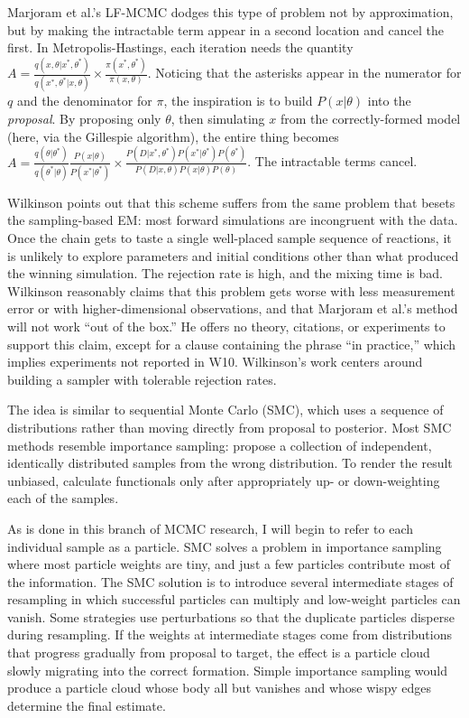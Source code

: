 \documentclass{article}
\begin{document}
Marjoram et al.'s LF-MCMC dodges this type of problem not by approximation, but by making the intractable term appear in a second location and cancel the first. In Metropolis-Hastings, each iteration needs the quantity $A=\frac{q(x, \theta|x^*, \theta^*)}{q(x^*, \theta^*|x, \theta)} \times \frac{\pi(x^*, \theta^*)}{\pi(x, \theta)}$. Noticing that the asterisks appear in the numerator for $q$ and the denominator for $\pi$, the inspiration is to build $P(x| \theta)$ into the {\it proposal}. By proposing only $\theta$, then simulating $x$ from the correctly-formed model (here, via the Gillespie algorithm), the entire thing becomes $A=\frac{q(\theta|\theta^*)}{q(\theta^*|\theta)} \frac{P(x|\theta)}{P(x^*|\theta^*)} \times \frac{P(D|x^*, \theta^*)P(x^*|\theta^*)P(\theta^*)}{P(D|x, \theta)P(x| \theta)P(\theta)}$. The intractable terms cancel.

Wilkinson points out that this scheme suffers from the same problem that besets the sampling-based EM: most forward simulations are incongruent with the data. Once the chain gets to taste a single well-placed sample sequence of reactions, it is unlikely to explore parameters and initial conditions other than what produced the winning simulation. The rejection rate is high, and the mixing time is bad. Wilkinson reasonably claims that this problem gets worse with less measurement error or with higher-dimensional observations, and that Marjoram et al.'s method will not work ``out of the box.'' He offers no theory, citations, or experiments to support this claim, except for a clause containing the phrase ``in practice,'' which implies experiments not reported in W10. Wilkinson's work centers around building a sampler with tolerable rejection rates. 

The idea is similar to sequential Monte Carlo (SMC), which uses a sequence of distributions rather than moving directly from proposal to posterior. Most SMC methods resemble importance sampling: propose a collection of independent, identically distributed samples from the wrong distribution. To render the result unbiased, calculate functionals only after appropriately up- or down-weighting each of the samples. 

As is done in this branch of MCMC research, I will begin to refer to each individual sample as a particle. SMC solves a problem in importance sampling where most particle weights are tiny, and just a few particles contribute most of the information. The SMC solution is to introduce several intermediate stages of resampling in which successful particles can multiply and low-weight particles can vanish. Some strategies use perturbations so that the duplicate particles disperse during resampling. If the weights at intermediate stages come from distributions that progress gradually from proposal to target, the effect is a particle cloud slowly migrating into the correct formation. Simple importance sampling would produce a particle cloud whose body all but vanishes and whose wispy edges determine the final estimate. 
\end{document}
